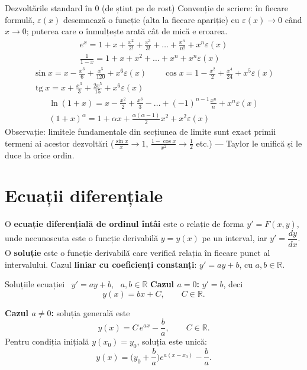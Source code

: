 \begin{tehbox}{Dezvoltările standard în $0$ (de știut pe de rost)}
Convenție de scriere: în fiecare formulă, $\varepsilon(x)$ desemnează o funcție (alta la fiecare apariție) cu $\varepsilon(x)\to0$ când $x\to0$; puterea care o înmulțește arată cât de mică e eroarea.
\[
\begin{gathered}
e^x=1+x+\frac{x^2}{2!}+\frac{x^3}{3!}+\dots+\frac{x^n}{n!}+x^n\varepsilon(x)\\
\frac{1}{1-x}=1+x+x^2+\dots+x^n+x^n\varepsilon(x)
\end{gathered}
\]
\[
\begin{gathered}
\sin x=x-\frac{x^3}{6}+\frac{x^5}{120}+x^6\varepsilon(x)
\qquad
\cos x=1-\frac{x^2}{2}+\frac{x^4}{24}+x^5\varepsilon(x)\\
\operatorname{tg} x=x+\frac{x^3}{3}+\frac{2x^5}{15}+x^6\varepsilon(x)
\end{gathered}
\]
\[
\begin{gathered}
\ln(1+x)=x-\frac{x^2}{2}+\frac{x^3}{3}-\dots+(-1)^{n-1}\frac{x^n}{n}+x^n\varepsilon(x)\\
(1+x)^{\alpha}=1+\alpha x+\frac{\alpha(\alpha-1)}{2}x^2+x^2\varepsilon(x)
\end{gathered}
\]
Observație: limitele fundamentale din secțiunea de limite sunt exact primii termeni ai acestor dezvoltări ($\frac{\sin x}{x}\to1$, $\frac{1-\cos x}{x^2}\to\frac12$ etc.) --- Taylor le unifică și le duce la orice ordin.
\end{tehbox}

\section*{Ecuații diferențiale}

\begin{definitie}
O \textbf{ecuație diferențială de ordinul întâi} este o relație de forma $y'=F(x,y)$, unde necunoscuta este o funcție derivabilă $y=y(x)$ pe un interval, iar $y'=\dfrac{dy}{dx}$. O \textbf{soluție} este o funcție derivabilă care verifică relația în fiecare punct al intervalului. Cazul \textbf{liniar cu coeficienți constanți}: $y'=ay+b$, cu $a,b\in\mathbb{R}$.
\end{definitie}

\begin{teobox}{Soluțiile ecuației \ $y'=ay+b$, \ $a,b\in\mathbb{R}$}
\textbf{Cazul $a=0$:} \quad $y'=b$, deci
\[
y(x)=bx+C,\qquad C\in\mathbb{R}.
\]

\textbf{Cazul $a \neq 0$:} \quad soluția generală este
\[
\boxed{\;y(x)=C\,e^{ax}-\frac{b}{a},\qquad C\in\mathbb{R}.\;}
\]
Pentru condiția inițială $y(x_0)=y_0$, soluția este unică:
\[
y(x)=\Big(y_0+\frac{b}{a}\Big)e^{a(x-x_0)}-\frac{b}{a}.
\]
\end{teobox}

